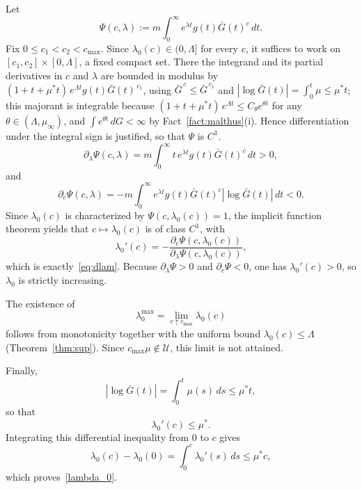\documentclass[letterpaper, 10pt, conference]{ieeeconf}
\makeatletter
\newcommand{\calU}{\mathcal{U}}
\newcommand{\Lbar}{\Lambda}
\newcommand{\rev}[1]{#1}
\newcommand{\pl}[1]{#1}
\newcommand{\edm}[1]{#1}
\renewenvironment{proof}[1][\proofname]{\par
  \pushQED{\qed}%
  \normalfont\topsep6\p@\@plus6\p@\relax
  \trivlist
  \item[\hskip\labelsep\itshape #1\@addpunct{.}]\ignorespaces
}{%
  \popQED\endtrivlist\@endpefalse
}
\renewenvironment{proof}[1][\proofname]{\par
  \pushQED{\qed}%
  \normalfont\topsep6\p@\@plus6\p@\relax
  \trivlist
  \item[\hskip\labelsep\itshape #1\@addpunct{.}]\ignorespaces
}{%
  \popQED\endtrivlist\@endpefalse
}
\makeatother
\begin{document}
\begin{proof}
\rev{
Let
\[
\Psi(c,\lambda)
:=
m\int_0^\infty
e^{\lambda t}g(t)\bar G(t)^c\,dt .
\]
Fix $0\le c_1<c_2<c_{\max}$. Since $\lambda_0(c)\in(0,\Lbar]$ for every
$c$, it suffices to work on $[c_1,c_2]\times[0,\Lbar]$, a fixed compact set.
There the integrand and its partial derivatives in $c$ and $\lambda$ are
bounded in modulus by $\edm{(1+t+\mu^\ast t)}\,e^{\Lbar t}g(t)\bar G(t)^{\,c_1}$,
using $\bar G^{\,c}\le\bar G^{\,c_1}$ and
$|\log\bar G(t)|=\int_0^t\mu\le\mu^\ast t$; this majorant is integrable because $\edm{(1+t+\mu^\ast t)}\,e^{\Lbar t}\le C_\theta e^{\theta t}$
for any $\theta\in(\Lbar,\mu_\infty)$, and $\int e^{\theta t}\,dG<\infty$ by
Fact~\ref{fact:malthus}(i). Hence differentiation under the integral sign is justified, so that $\Psi$ is $C^1$.
\[
\partial_\lambda\Psi(c,\lambda)
=
m\int_0^\infty
t\,e^{\lambda t}g(t)\bar G(t)^c\,dt
>0,
\]
and
\[
\partial_c\Psi(c,\lambda)
=
-m\int_0^\infty
e^{\lambda t}g(t)\bar G(t)^c
|\log\bar G(t)|\,dt
<0.
\]
Since $\lambda_0(c)$ is characterized by
$\Psi(c,\lambda_0(c))=1$, the implicit function theorem yields that
$c\mapsto\lambda_0(c)$ is of class $C^1$, with
\[
\lambda_0'(c)
=
-
\frac{\partial_c\Psi(c,\lambda_0(c))}
{\partial_\lambda\Psi(c,\lambda_0(c))},
\]
which is exactly~\eqref{eq:dlam}. Because
$\partial_\lambda\Psi>0$ and $\partial_c\Psi<0$, one has
$\lambda_0'(c)>0$, so $\lambda_0$ is strictly increasing.

The existence of
\[
\lambda_0^{\max}
=
\lim_{c\uparrow c_{\max}}\lambda_0(c)
\]
follows from monotonicity together with the uniform bound
$\lambda_0(c)\le\Lbar$ (Theorem~\ref{thm:sup}). Since $\edm{c_{\max}\mu\notin\calU}$,
this limit is not attained.

Finally,
\[
|\log\bar G(t)|
=
\int_0^t\mu(s)\,ds
\le
\mu^\ast t,
\]
\pl{so that}
\[
\lambda_0'(c)
\le
\mu^\ast.
\]
Integrating this differential inequality from $0$ to $c$ gives
\[
\lambda_0(c)-\lambda_0(0)
=
\int_0^c\lambda_0'(s)\,ds
\le
\mu^\ast c,
\]
which proves~\eqref{lambda_0}.
}
\end{proof}
\end{document}
